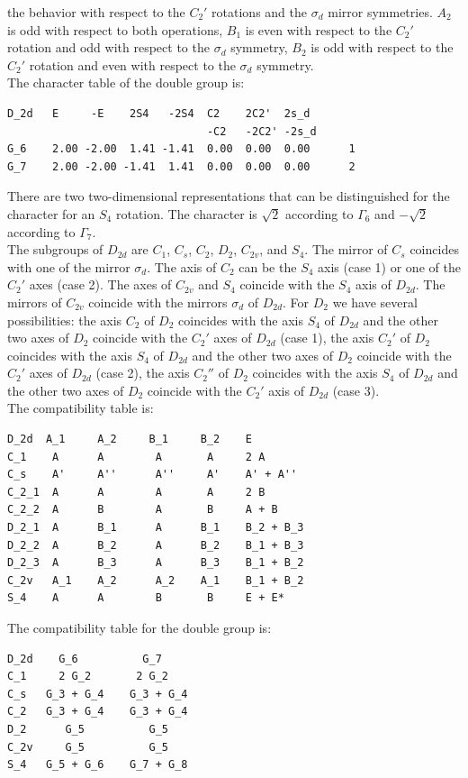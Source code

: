\documentclass[12pt,a4paper]{article}
\begin{document}
the behavior with respect to the $C_2'$ rotations and the $\sigma_d$
mirror symmetries. $A_2$ is odd with respect to both operations, $B_1$ is
even with respect to the $C_2'$ rotation and odd with respect to the
$\sigma_d$ symmetry, $B_2$ is odd with respect to the $C_2'$ rotation and 
even with respect to the $\sigma_d$ symmetry. \\
The character table of the double group is:
\begin{verbatim}
D_2d   E     -E    2S4   -2S4  C2    2C2'  2s_d 
                               -C2   -2C2' -2s_d
G_6    2.00 -2.00  1.41 -1.41  0.00  0.00  0.00      1
G_7    2.00 -2.00 -1.41  1.41  0.00  0.00  0.00      2
\end{verbatim}
There are two two-dimensional representations that can be distinguished
for the character for an $S_4$ rotation. The character is $\sqrt{2}$
according to $\Gamma_6$ and $-\sqrt{2}$ according to $\Gamma_7$. \\
The subgroups of $D_{2d}$ are $C_1$, $C_s$, $C_2$, $D_2$, $C_{2v}$, 
and $S_4$. The mirror of $C_s$ coincides with one of the mirror $\sigma_d$. 
The axis of $C_2$ can be the $S_4$ axis (case 1) or one of the 
$C_2'$ axes (case 2). The axes of $C_{2v}$ and $S_4$
coincide with the $S_4$ axis of $D_{2d}$. The mirrors of $C_{2v}$
coincide with the mirrors $\sigma_d$ of $D_{2d}$. For $D_2$ we have several 
possibilities: the axis $C_2$ of $D_2$ coincides with the axis $S_4$
of $D_{2d}$ and the other two axes of $D_2$ coincide with the $C_2'$ axes
of $D_{2d}$ (case 1), the axis $C_2'$ of $D_2$ coincides with the axis $S_4$
of $D_{2d}$ and the other two axes of $D_2$ coincide with the $C_2'$ axes
of $D_{2d}$ (case 2), the axis $C_2''$ of $D_2$ coincides with the axis 
$S_4$ of $D_{2d}$ and the other two axes of $D_2$ coincide with the $C_2'$ 
axis of $D_{2d}$ (case 3). \\
The compatibility table is:
\begin{verbatim}
D_2d  A_1     A_2     B_1     B_2    E
C_1    A      A        A       A     2 A 
C_s    A'     A''      A''     A'    A' + A''  
C_2_1  A      A        A       A     2 B
C_2_2  A      B        A       B     A + B
D_2_1  A      B_1      A      B_1    B_2 + B_3
D_2_2  A      B_2      A      B_2    B_1 + B_3
D_2_3  A      B_3      A      B_3    B_1 + B_2
C_2v   A_1    A_2      A_2    A_1    B_1 + B_2
S_4    A      A        B       B     E + E*
\end{verbatim}
The compatibility table for the double group is:
\begin{verbatim}
D_2d    G_6          G_7  
C_1     2 G_2       2 G_2 
C_s   G_3 + G_4    G_3 + G_4
C_2   G_3 + G_4    G_3 + G_4
D_2      G_5          G_5
C_2v     G_5          G_5
S_4   G_5 + G_6    G_7 + G_8
\end{verbatim}
\end{document}
